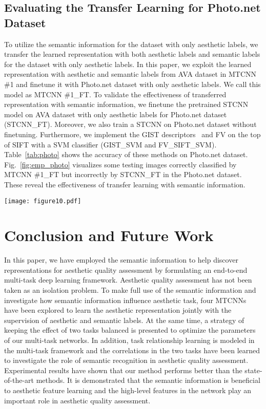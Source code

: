 \documentclass[journal]{IEEEtran}
\begin{document}
\subsection{Evaluating the Transfer Learning for Photo.net Dataset}
 To utilize the semantic information for the dataset with only aesthetic labels, we transfer the learned representation with both aesthetic labels and semantic labels for the dataset with only aesthetic labels. In this paper, we exploit the learned representation with aesthetic and semantic labels from AVA dataset in MTCNN \#1 and finetune it with Photo.net dataset with only aesthetic labels. We call this model as MTCNN \#1\_FT. To validate the effectiveness of transferred representation with semantic information, we finetune the pretrained STCNN model on AVA dataset with only aesthetic labels for Photo.net dataset (STCNN\_FT). Moreover, we also train a STCNN on Photo.net dataset without finetuning. Furthermore, we implement the GIST descriptors~\cite{Oliva01} and FV on the top of SIFT with a SVM classifier (GIST\_SVM and FV\_SIFT\_SVM). Table~\ref{tab:photo} shows the accuracy of these methods on Photo.net dataset. Fig.~\ref{fig:emp_photo} visualizes some testing images correctly classified by MTCNN \#1\_FT but incorrectly by STCNN\_FT in the Photo.net dataset. These reveal the effectiveness of transfer learning with semantic information.
  \begin{figure*}
  \centering
\texttt{[image: figure10.pdf]}\\
\caption{Example test images correctly classified by MTCNN \#1\_FT but incorrectly by STCNN\_FT in the Photo.net dataset. The labels of the images on the first and second rows are high aesthetic quality, and the labels of the images on the third and fourth rows are low aesthetic quality. }
  \label{fig:emp_photo}
\end{figure*}


\section{Conclusion and Future Work \label{sec:con}}
In this paper, we have employed the semantic information to help discover representations for aesthetic quality assessment by formulating an end-to-end multi-task deep learning framework. Aesthetic quality assessment has not been taken as an isolation problem. To make full use of the semantic information and investigate how semantic information influence aesthetic task, four MTCNNs have been explored to learn the aesthetic representation jointly with the supervision of aesthetic and semantic labels. At the same time, a strategy of keeping the effect of two tasks balanced is presented to optimize the parameters of our multi-task networks. In addition, task relationship learning is modeled in the multi-task framework and the correlations in the two tasks have been learned to investigate the role of semantic recognition in aesthetic quality assessment. Experimental results have shown that our method performs better than the state-of-the-art methods. It is demonstrated that the semantic information is beneficial to aesthetic feature learning and the high-level features in the network play an important role in aesthetic quality assessment. 
\end{document}
